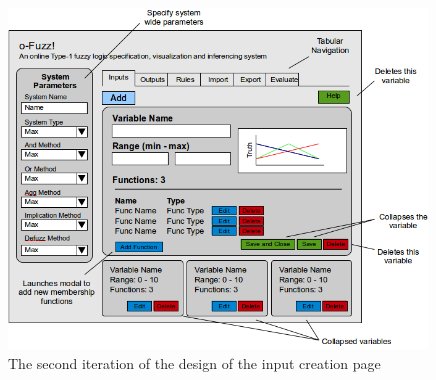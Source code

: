 \begin{figure}[ht!]
\begin{center}
\includegraphics[width=0.99\textwidth]{images/secondItInputs}
\end{center}
\vspace{-6mm}
\caption{The second iteration of the design of the input creation page}
\label{fig:design-secondIterationInputs}

\end{figure}
\noindent

